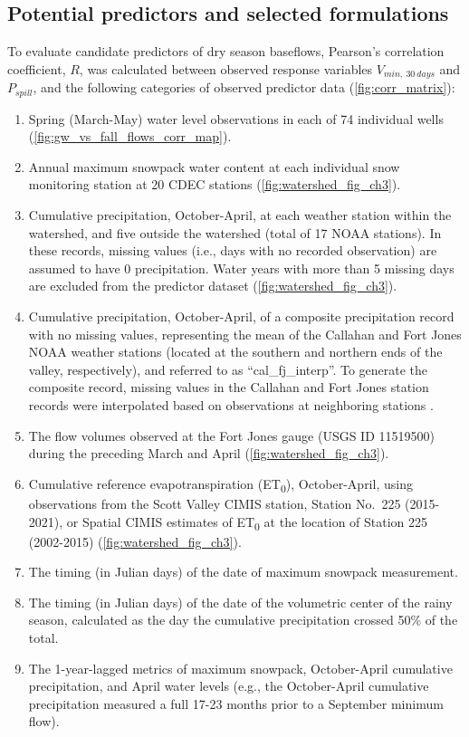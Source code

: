 \documentclass[hess, manuscript]{copernicus}
\providecommand{\tightlist}{%
  \setlength{\itemsep}{0pt}\setlength{\parskip}{0pt}}
\begin{document}
\subsection{Potential predictors and selected formulations}

To evaluate candidate predictors of dry season baseflows, Pearson's
correlation coefficient, \(R\), was calculated between observed response
variables \(V_{min,~30~days}\) and \(P_{spill}\), and the following
categories of observed predictor data (\autoref{fig:corr_matrix}):

\begin{enumerate}
\def\labelenumi{\arabic{enumi}.}
\tightlist
\item
  Spring (March-May) water level observations in each of 74 individual
  wells (\autoref{fig:gw_vs_fall_flows_corr_map}).
\item
  Annual maximum snowpack water content at each individual snow
  monitoring station at 20 CDEC stations
  (\autoref{fig:watershed_fig_ch3}).
\item
  Cumulative precipitation, October-April, at each weather station
  within the watershed, and five outside the watershed (total of 17 NOAA
  stations). In these records, missing values (i.e., days with no
  recorded observation) are assumed to have 0 precipitation. Water years
  with more than 5 missing days are excluded from the predictor dataset
  (\autoref{fig:watershed_fig_ch3}).
\item
  Cumulative precipitation, October-April, of a composite precipitation
  record with no missing values, representing the mean of the Callahan
  and Fort Jones NOAA weather stations (located at the southern and
  northern ends of the valley, respectively), and referred to as
  ``cal\_fj\_interp''. To generate the composite record, missing values
  in the Callahan and Fort Jones station records were interpolated based
  on observations at neighboring stations \citep[see method
  in][]{Foglia2013a}.
\item
  The flow volumes observed at the Fort Jones gauge (USGS ID 11519500)
  during the preceding March and April
  (\autoref{fig:watershed_fig_ch3}).
\item
  Cumulative reference evapotranspiration (ET\textsubscript{0}),
  October-April, using observations from the Scott Valley CIMIS station,
  Station No.~225 (2015-2021), or Spatial CIMIS estimates of
  ET\textsubscript{0} at the location of Station 225 (2002-2015)
  (\autoref{fig:watershed_fig_ch3}).
\item
  The timing (in Julian days) of the date of maximum snowpack
  measurement.
\item
  The timing (in Julian days) of the date of the volumetric center of
  the rainy season, calculated as the day the cumulative precipitation
  crossed 50\% of the total.
\item
  The 1-year-lagged metrics of maximum snowpack, October-April
  cumulative precipitation, and April water levels (e.g., the
  October-April cumulative precipitation measured a full 17-23 months
  prior to a September minimum flow).
\end{enumerate}
\end{document}
